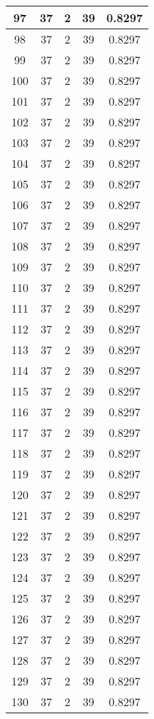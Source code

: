 \documentclass[letterpaper, 12pt]{article}
\begin{document}
\begin{longtable}{|c|c|c|c|c|}
\hline
97 & 37 & 2 & 39 & 0.8297 \\
\hline
98 & 37 & 2 & 39 & 0.8297 \\
\hline
99 & 37 & 2 & 39 & 0.8297 \\
\hline
100 & 37 & 2 & 39 & 0.8297 \\
\hline
101 & 37 & 2 & 39 & 0.8297 \\
\hline
102 & 37 & 2 & 39 & 0.8297 \\
\hline
103 & 37 & 2 & 39 & 0.8297 \\
\hline
104 & 37 & 2 & 39 & 0.8297 \\
\hline
105 & 37 & 2 & 39 & 0.8297 \\
\hline
106 & 37 & 2 & 39 & 0.8297 \\
\hline
107 & 37 & 2 & 39 & 0.8297 \\
\hline
108 & 37 & 2 & 39 & 0.8297 \\
\hline
109 & 37 & 2 & 39 & 0.8297 \\
\hline
110 & 37 & 2 & 39 & 0.8297 \\
\hline
111 & 37 & 2 & 39 & 0.8297 \\
\hline
112 & 37 & 2 & 39 & 0.8297 \\
\hline
113 & 37 & 2 & 39 & 0.8297 \\
\hline
114 & 37 & 2 & 39 & 0.8297 \\
\hline
115 & 37 & 2 & 39 & 0.8297 \\
\hline
116 & 37 & 2 & 39 & 0.8297 \\
\hline
117 & 37 & 2 & 39 & 0.8297 \\
\hline
118 & 37 & 2 & 39 & 0.8297 \\
\hline
119 & 37 & 2 & 39 & 0.8297 \\
\hline
120 & 37 & 2 & 39 & 0.8297 \\
\hline
121 & 37 & 2 & 39 & 0.8297 \\
\hline
122 & 37 & 2 & 39 & 0.8297 \\
\hline
123 & 37 & 2 & 39 & 0.8297 \\
\hline
124 & 37 & 2 & 39 & 0.8297 \\
\hline
125 & 37 & 2 & 39 & 0.8297 \\
\hline
126 & 37 & 2 & 39 & 0.8297 \\
\hline
127 & 37 & 2 & 39 & 0.8297 \\
\hline
128 & 37 & 2 & 39 & 0.8297 \\
\hline
129 & 37 & 2 & 39 & 0.8297 \\
\hline
130 & 37 & 2 & 39 & 0.8297 \\

\end{longtable}
\end{document}
